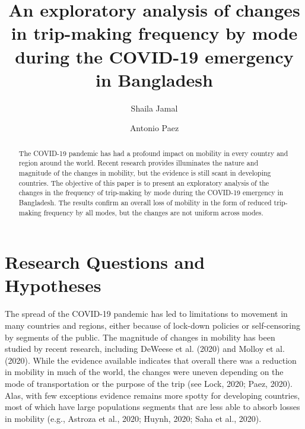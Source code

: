 \documentclass[]{elsarticle} %
\begin{document}
\begin{frontmatter}

  \title{An exploratory analysis of changes in trip-making frequency by mode
during the COVID-19 emergency in Bangladesh}
    \author[McMaster University]{Shaila Jamal}
    \author[McMaster University]{Antonio Paez}
      \address[McMaster University]{School of Earth, Environment and Society, McMaster University, Hamilton,
ON, L8S 4K1, Canada}
  
  \begin{abstract}
  The COVID-19 pandemic has had a profound impact on mobility in every
  country and region around the world. Recent research provides
  illuminates the nature and magnitude of the changes in mobility, but the
  evidence is still scant in developing countries. The objective of this
  paper is to present an exploratory analysis of the changes in the
  frequency of trip-making by mode during the COVID-19 emergency in
  Bangladesh. The results confirm an overall loss of mobility in the form
  of reduced trip-making frequency by all modes, but the changes are not
  uniform across modes.
  \end{abstract}
  
 \end{frontmatter}

\hypertarget{research-questions-and-hypotheses}{%
\section{Research Questions and
Hypotheses}\label{research-questions-and-hypotheses}}

The spread of the COVID-19 pandemic has led to limitations to movement
in many countries and regions, either because of lock-down policies or
self-censoring by segments of the public. The magnitude of changes in
mobility has been studied by recent research, including DeWeese et al.
(2020) and Molloy et al. (2020). While the evidence available indicates
that overall there was a reduction in mobility in much of the world, the
changes were uneven depending on the mode of transportation or the
purpose of the trip (see Lock, 2020; Paez, 2020). Alas, with few
exceptions evidence remains more spotty for developing countries, most
of which have large populations segments that are less able to absorb
losses in mobility (e.g., Astroza et al., 2020; Huynh, 2020; Saha et
al., 2020).
\end{document}
